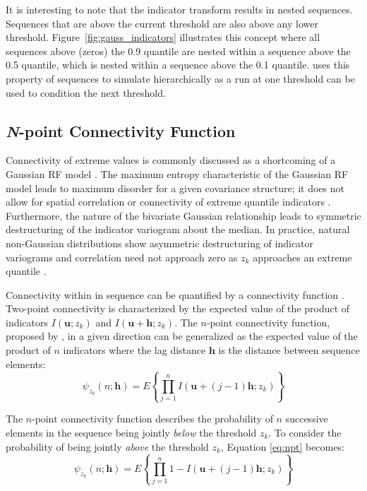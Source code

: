 It is interesting to note that the indicator transform results in nested sequences. Sequences that are above the current threshold are also above any lower threshold. Figure~\ref{fig:gauss_indicators} illustrates this concept where all sequences above (zeros) the 0.9 quantile are nested within a sequence above the 0.5 quantile, which is nested within a sequence above the 0.1 quantile. \cite{ortiz2003characterization} uses this property of sequences to simulate hierarchically as a run at one threshold can be used to condition the next threshold.

\FloatBarrier
\subsection{\textit{N}-point Connectivity Function}
\label{subsec:03npoint}

Connectivity of extreme values is commonly discussed as a shortcoming of a Gaussian \gls{RF} model \citep{journel1993entropy,journel1989nongaussian}. The maximum entropy characteristic of the Gaussian \gls{RF} model leads to maximum disorder for a given covariance structure; it does not allow for spatial correlation or connectivity of extreme quantile indicators \citep{journel1989nongaussian}. Furthermore, the nature of the bivariate Gaussian relationship leads to symmetric destructuring of the indicator variogram about the median. In practice, natural non-Gaussian distributions show asymmetric destructuring of indicator variograms \citep{vincent2021multipleindicator} and correlation need not approach zero as $z_{k}$ approaches an extreme quantile \citep{journel1989nongaussian}.

Connectivity within in sequence can be quantified by a connectivity function \citep{renard2011conditioning}. Two-point connectivity is characterized by the expected value of the product of indicators $I(\mathbf{u}; z_{k})$ and $I(\mathbf{u}+\mathbf{h}; z_{k})$. The $n\text{-point}$ connectivity function, proposed by \cite{journel1989nongaussian}, in a given direction can be generalized as the expected value of the product of $n$ indicators where the lag distance $\mathbf{h}$ is the distance between sequence elements:
\begin{equation}
    \psi_{z_{k}}(n;\mathbf{h}) = E\left\{\prod_{j=1}^{n} I(\mathbf{u} + (j-1)\mathbf{h}; z_{k})\right\}
    \label{eq:npt}
\end{equation}

The $n\text{-point}$ connectivity function describes the probability of $n$ successive elements in the sequence being jointly \emph{below} the threshold $z_{k}$. To consider the probability of being jointly \emph{above} the threshold $z_{k}$, Equation \ref{eq:npt} becomes:
\begin{equation}
    \psi_{z_{k}}(n;\mathbf{h}) = E\left\{\prod_{j=1}^{n} 1 - I(\mathbf{u} + (j-1)\mathbf{h}; z_{k})\right\}
    \label{eq:npt2}
\end{equation}

